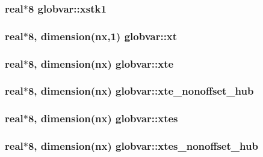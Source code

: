 \subsubsection[{xstk1}]{\setlength{\rightskip}{0pt plus 5cm}real$\ast$8 globvar\+::xstk1}\label{namespaceglobvar_a6b041a8fbed932e28a5d0426dc9dc20a}
\hypertarget{namespaceglobvar_aee98d6758bfc663151ebb025dc270fa3}{}
\subsubsection[{xt}]{\setlength{\rightskip}{0pt plus 5cm}real$\ast$8, dimension({\bf nx},1) globvar\+::xt}\label{namespaceglobvar_aee98d6758bfc663151ebb025dc270fa3}
\hypertarget{namespaceglobvar_a8f63012c2466eb1bb44ecf69fbec3f8c}{}
\subsubsection[{xte}]{\setlength{\rightskip}{0pt plus 5cm}real$\ast$8, dimension({\bf nx}) globvar\+::xte}\label{namespaceglobvar_a8f63012c2466eb1bb44ecf69fbec3f8c}
\hypertarget{namespaceglobvar_a931dc7aa3dcd2482c0788547aacdfd40}{}
\subsubsection[{xte\+\_\+nonoffset\+\_\+hub}]{\setlength{\rightskip}{0pt plus 5cm}real$\ast$8, dimension({\bf nx}) globvar\+::xte\+\_\+nonoffset\+\_\+hub}\label{namespaceglobvar_a931dc7aa3dcd2482c0788547aacdfd40}
\hypertarget{namespaceglobvar_a62fe8af457ae0993ea2e29369284a43c}{}
\subsubsection[{xtes}]{\setlength{\rightskip}{0pt plus 5cm}real$\ast$8, dimension({\bf nx}) globvar\+::xtes}\label{namespaceglobvar_a62fe8af457ae0993ea2e29369284a43c}
\hypertarget{namespaceglobvar_aae34d48eb8f1d7c8720c099222880643}{}
\subsubsection[{xtes\+\_\+nonoffset\+\_\+hub}]{\setlength{\rightskip}{0pt plus 5cm}real$\ast$8, dimension({\bf nx}) globvar\+::xtes\+\_\+nonoffset\+\_\+hub}\label{namespaceglobvar_aae34d48eb8f1d7c8720c099222880643}
\hypertarget{namespaceglobvar_adeaf213bc236c950b34c4e2fb10cf12d}{}
